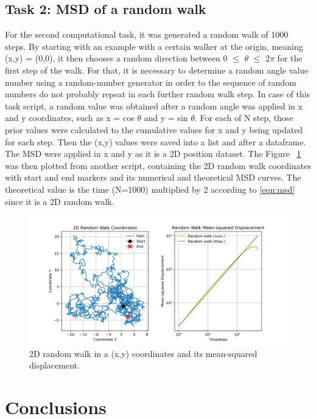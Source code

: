 \documentclass{article}
\begin{document}
\subsection{Task 2: MSD of a random walk}

For the second computational task, it was generated a random walk of 1000 steps. By starting with an example with a certain walker at the origin, meaning (x,y) = (0,0), it then chooses a random direction between 0 $\leq$ $\theta$ $\leq$ $2\pi$ for the first step of the walk. For that, it is necessary to determine a random angle value number using a random-number generator in order to the sequence of random numbers do not probably repeat in each further random walk step. In case of this task script, a random value was obtained after a random angle was applied in x and y coordinates, such as x = cos $\theta$ and y = sin $\theta$. For each of N step, those prior values were calculated to the cumulative values for x and y being updated for each step. Then the (x,y) values were saved into a list and after a dataframe. The MSD were applied in x and y as it is a 2D position dataset. The Figure ~\ref{fig:msd_plot} was then plotted from another script, containing the 2D random walk coordinates with start and end markers and its numerical and theoretical MSD curves. The theoretical value is the time (N=1000) multiplied by 2 according to \ref{eqn:msd} since it is a 2D random walk.

\begin{figure}[H]
\includegraphics[width=\linewidth]{msd_plot.png}
\caption{2D random walk in a (x,y) coordinates and its mean-squared displacement.}
\label{fig:msd_plot}
\end{figure}

\section{Conclusions}
\end{document}
